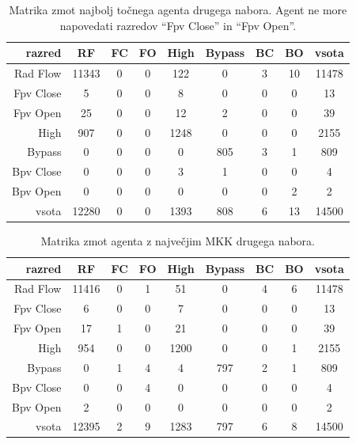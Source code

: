 \begin{table}[H]
    \centering
    \begin{tabular}{||rcccccccc||}
        \hline
        razred    & RF    & FC & FO & High & Bypass & BC & BO & vsota \\ \hline
        Rad Flow  & 11343 & 0  & 0  & 122  & 0      & 3  & 10 & 11478 \\ \hline
        Fpv Close & 5     & 0  & 0  & 8    & 0      & 0  & 0  & 13    \\ \hline
        Fpv Open  & 25    & 0  & 0  & 12   & 2      & 0  & 0  & 39    \\ \hline
        High      & 907   & 0  & 0  & 1248 & 0      & 0  & 0  & 2155  \\ \hline
        Bypass    & 0     & 0  & 0  & 0    & 805    & 3  & 1  & 809   \\ \hline
        Bpv Close & 0     & 0  & 0  & 3    & 1      & 0  & 0  & 4     \\ \hline
        Bpv Open  & 0     & 0  & 0  & 0    & 0      & 0  & 2  & 2     \\ \hline
        vsota     & 12280 & 0  & 0  & 1393 & 808    & 6  & 13 & 14500 \\ \hline
    \end{tabular}
    \caption{Matrika zmot najbolj točnega agenta drugega nabora. Agent ne more napovedati razredov \enquote{Fpv Close} in \enquote{Fpv Open}.}
    \label{tab:statlog_acc_2}
\end{table}

\begin{table}[H]
    \centering
    \begin{tabular}{||rcccccccc||}
        \hline
        razred    & RF    & FC & FO & High & Bypass & BC & BO & vsota \\ \hline
        Rad Flow  & 11416 & 0  & 1  & 51   & 0      & 4  & 6  & 11478 \\ \hline
        Fpv Close & 6     & 0  & 0  & 7    & 0      & 0  & 0  & 13    \\ \hline
        Fpv Open  & 17    & 1  & 0  & 21   & 0      & 0  & 0  & 39    \\ \hline
        High      & 954   & 0  & 0  & 1200 & 0      & 0  & 1  & 2155  \\ \hline
        Bypass    & 0     & 1  & 4  & 4    & 797    & 2  & 1  & 809   \\ \hline
        Bpv Close & 0     & 0  & 4  & 0    & 0      & 0  & 0  & 4     \\ \hline
        Bpv Open  & 2     & 0  & 0  & 0    & 0      & 0  & 0  & 2     \\ \hline
        vsota     & 12395 & 2  & 9  & 1283 & 797    & 6  & 8  & 14500 \\ \hline
    \end{tabular}
    \caption{Matrika zmot agenta z največjim MKK drugega nabora.}
    \label{tab:statlog_mcc_2}
\end{table}

